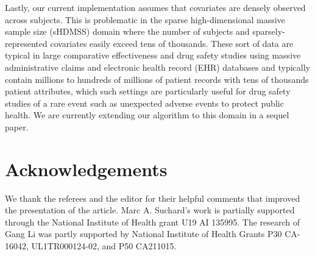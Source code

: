 Lastly, our current implementation assumes that covariates are densely observed across subjects. This is problematic in the sparse high-dimensional massive sample size (sHDMSS) domain \citep{mittal2013high} where the number of subjects and sparsely-represented covariates easily exceed tens of thousands. These sort of data are typical in large comparative effectiveness and drug safety studies using massive administrative claims and electronic health record (EHR) databases and typically contain millions to hundreds of millions of
patient records with tens of thousands patient attributes,
which such settings are particularly useful  for drug safety studies of a rare event such as unexpected adverse events 
\citep{schuemie2018improving} to protect public health. We are currently extending our algorithm to this domain in a sequel paper. 


\section{Acknowledgements}
{\color{blue} We thank the referees and the editor for their helpful comments that improved the presentation of the article}.
Marc A. Suchard's work is partially supported through the National Institute of Health grant U19 AI 135995. The research of Gang Li was partly supported by National Institute of Health Grants P30 CA-16042, UL1TR000124-02, and P50 CA211015.


%



\newpage

